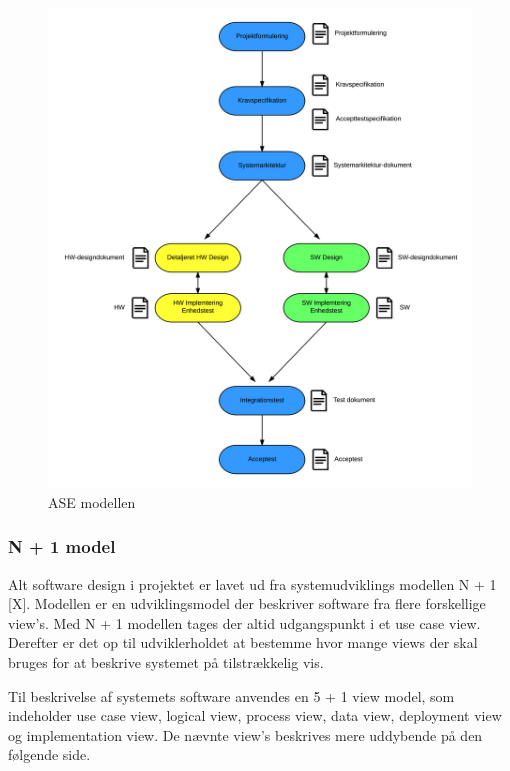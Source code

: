 \begin{figure}[H]
	\centering
	\includegraphics[width=1\textwidth]{Billeder/Udviklingsproces/ase_model}
	\caption{ASE modellen}
	\label{fig:dokument_udvikling}
\end{figure}

\newpage

\subsubsection*{N + 1 model}
Alt software design i projektet er lavet ud fra systemudviklings modellen N + 1 [X]. Modellen er en udviklingsmodel der beskriver software fra flere forskellige view's.  
Med N + 1 modellen tages der altid udgangspunkt i et use case view. Derefter er det op til udviklerholdet at bestemme hvor mange views der skal bruges for at beskrive systemet på tilstrækkelig vis. 

Til beskrivelse af systemets software anvendes en 5 + 1 view model, som indeholder use case view, logical view, process view, data view, deployment view og implementation view. De nævnte view's beskrives mere uddybende på den følgende side. 

